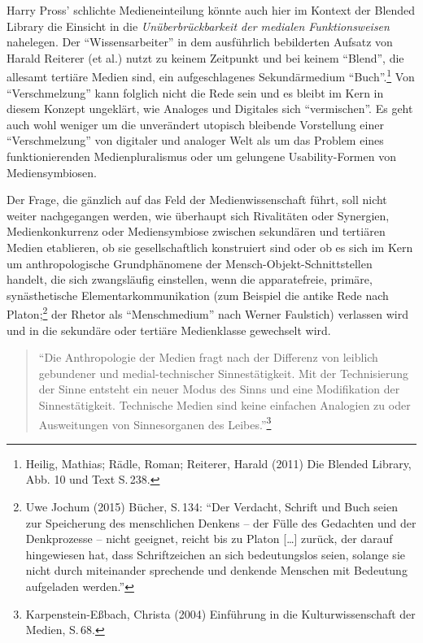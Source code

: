 \documentclass[a4paper,
fontsize=11pt,
oneside,
numbers=noperiodatend,
parskip=half-,
bibliography=totoc,
final
]{scrartcl}
\begin{document}
Harry Pross' schlichte Medieneinteilung könnte auch hier im Kontext der
Blended Library die Einsicht in die \emph{Unüberbrückbarkeit der
medialen Funktionsweisen} nahelegen. Der \enquote{Wissensarbeiter} in
dem ausführlich bebilderten Aufsatz von Harald Reiterer (et al.) nutzt
zu keinem Zeitpunkt und bei keinem \enquote{Blend}, die allesamt
tertiäre Medien sind, ein aufgeschlagenes Sekundärmedium
\enquote{Buch}.\footnote{Heilig, Mathias; Rädle, Roman; Reiterer, Harald
  (2011) Die Blended Library, Abb. 10 und Text S.\,238.} Von
\enquote{Verschmelzung} kann folglich nicht die Rede sein und es bleibt
im Kern in diesem Konzept ungeklärt, wie Analoges und Digitales sich
\enquote{vermischen}. Es geht auch wohl weniger um die unverändert
utopisch bleibende Vorstellung einer \enquote{Verschmelzung} von
digitaler und analoger Welt als um das Problem eines funktionierenden
Medienpluralismus oder um gelungene Usability-Formen von
Mediensymbiosen.

Der Frage, die gänzlich auf das Feld der Medienwissenschaft führt, soll
nicht weiter nachgegangen werden, wie überhaupt sich Rivalitäten oder
Synergien, Medienkonkurrenz oder Mediensymbiose zwischen sekundären und
tertiären Medien etablieren, ob sie gesellschaftlich konstruiert sind
oder ob es sich im Kern um anthropologische Grundphänomene der
Mensch-Objekt-Schnitt\-stellen handelt, die sich zwangsläufig einstellen,
wenn die apparatefreie, primäre, synästhetische Elementarkommunikation
(zum Beispiel die antike Rede nach Platon;\footnote{Uwe Jochum (2015)
  Bücher, S.\,134: \enquote{Der Verdacht, Schrift und Buch seien zur
  Speicherung des menschlichen Denkens -- der Fülle des Gedachten und
  der Denkprozesse -- nicht geeignet, reicht bis zu Platon
  {[}\ldots{}{]} zurück, der darauf hingewiesen hat, dass Schriftzeichen
  an sich bedeutungslos seien, solange sie nicht durch miteinander
  sprechende und denkende Menschen mit Bedeutung aufgeladen werden.}}
der Rhetor als \enquote{Menschmedium} nach Werner Faulstich) verlassen
wird und in die sekundäre oder tertiäre Medienklasse gewechselt wird.

\begin{quote}
\enquote{Die Anthropologie der Medien fragt nach der Differenz von
leiblich gebundener und medial-technischer Sinnestätigkeit. Mit der
Technisierung der Sinne entsteht ein neuer Modus des Sinns und eine
Modifikation der Sinnestätigkeit. Technische Medien sind keine einfachen
Analogien zu oder Ausweitungen von Sinnesorganen des Leibes.}\footnote{Karpenstein-Eßbach,
  Christa (2004) Einführung in die Kulturwissenschaft der Medien, S.\,68.}
\end{quote}
\end{document}
